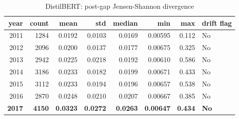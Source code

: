 \begin{table}[ht]
\centering
\caption{DistilBERT: post-gap Jensen-Shannon divergence}
\label{tab:distilbert_jsd_yearly}
\begin{tabular}{rrrrrrrl}
\toprule
year & count & mean & std & median & min & max & drift flag \\
\midrule
2011 & 1284 & 0.0192 & 0.0103 & 0.0169 & 0.00595 & 0.112 & No \\
2012 & 2096 & 0.0200 & 0.0137 & 0.0177 & 0.00675 & 0.325 & No \\
2013 & 2942 & 0.0225 & 0.0218 & 0.0192 & 0.00610 & 0.586 & No \\
2014 & 3186 & 0.0233 & 0.0182 & 0.0199 & 0.00671 & 0.433 & No \\
2015 & 3112 & 0.0233 & 0.0194 & 0.0196 & 0.00657 & 0.538 & No \\
2016 & 2870 & 0.0248 & 0.0210 & 0.0207 & 0.00667 & 0.385 & No \\
\textbf{2017} & \textbf{4150} & \textbf{0.0323} & \textbf{0.0272} & \textbf{0.0263} & \textbf{0.00647} & \textbf{0.434} & \textbf{No} \\
\bottomrule
\end{tabular}
\end{table}
